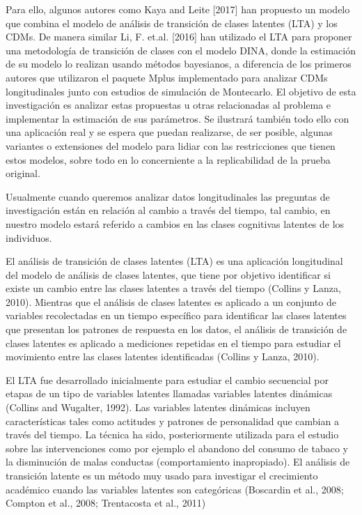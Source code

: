 		Para ello, algunos autores como Kaya and Leite [2017] han propuesto un modelo que combina el modelo de an\'{a}lisis de transici\'{o}n de clases latentes (LTA) y los CDMs. De manera similar Li, F. et.al. [2016] han utilizado el LTA para proponer una metodolog\'{i}a de transici\'{o}n de clases con el modelo DINA, donde la estimaci\'{o}n de su modelo lo realizan usando m\'{e}todos bayesianos, a diferencia de los primeros autores que utilizaron el paquete Mplus implementado para analizar CDMs longitudinales junto con estudios de simulaci\'{o}n de Montecarlo. El objetivo de esta investigaci\'{o}n es analizar estas propuestas u otras relacionadas al problema e implementar la estimaci\'{o}n de sus par\'{a}metros. Se ilustrar\'{a} tambi\'{e}n todo ello con una aplicaci\'{o}n real y se espera que puedan realizarse, de ser posible, algunas variantes o extensiones del modelo para lidiar con las restricciones que tienen estos modelos, sobre todo en lo concerniente a la replicabilidad de la prueba original.
		
		Usualmente cuando queremos analizar datos longitudinales las preguntas de investigaci\'{o}n est\'{a}n en relaci\'{o}n al cambio a trav\'{e}s del tiempo, tal cambio, en nuestro modelo estar\'{a} referido a cambios en las clases cognitivas latentes de los individuos.
		
		El an\'{a}lisis de transici\'{o}n de clases latentes (LTA) es una aplicaci\'{o}n longitudinal del modelo de an\'{a}lisis de clases latentes, que tiene por objetivo identificar si existe un cambio entre las clases latentes a trav\'{e}s del tiempo (Collins y Lanza, 2010). Mientras que el an\'{a}lisis de clases latentes es aplicado a un conjunto de variables recolectadas en un tiempo espec\'{i}fico para identificar las clases latentes que presentan los patrones de respuesta en los datos, el an\'{a}lisis de transici\'{o}n de clases latentes es aplicado a mediciones repetidas en el tiempo para estudiar el movimiento entre las clases latentes identificadas (Collins y Lanza, 2010).
		
		El LTA fue desarrollado inicialmente para estudiar el cambio secuencial por etapas de un tipo de variables latentes llamadas variables latentes din\'{a}micas (Collins and Wugalter, 1992). Las variables latentes din\'{a}micas incluyen caracter\'{i}sticas tales como actitudes y patrones de personalidad que cambian a trav\'{e}s del tiempo. La t\'{e}cnica ha sido, posteriormente utilizada para el estudio sobre las intervenciones como por ejemplo el abandono del consumo de tabaco y la disminuci\'{o}n de malas conductas (comportamiento inapropiado). El an\'{a}lisis de transici\'{o}n latente es un m\'{e}todo muy usado para investigar el crecimiento acad\'{e}mico cuando las variables latentes son categ\'{o}ricas (Boscardin et al., 2008; Compton et al., 2008; Trentacosta et al., 2011) 
		
